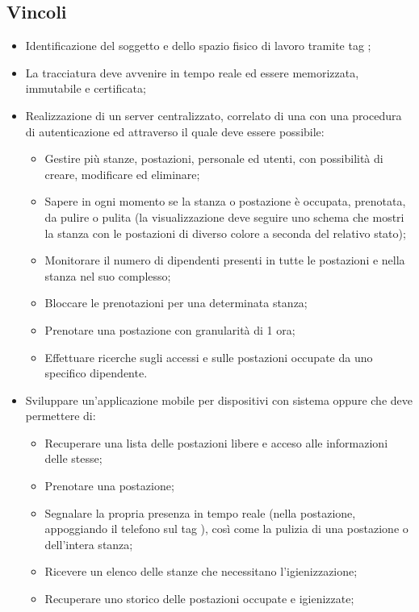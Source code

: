 \subsection{Vincoli}
\begin{itemize}
\item Identificazione del soggetto e dello spazio fisico di lavoro tramite tag ;
\item La tracciatura deve avvenire in tempo reale ed essere memorizzata, immutabile e certificata;
\item Realizzazione di un server centralizzato, correlato di una  con una procedura di autenticazione ed attraverso il quale deve essere possibile:
\begin{itemize}
\item Gestire più stanze, postazioni, personale ed utenti, con possibilità di creare, modificare ed eliminare;
\item Sapere in ogni momento se la stanza o postazione è occupata, prenotata, da pulire o pulita (la visualizzazione deve seguire uno schema che mostri la stanza con le postazioni di diverso colore a seconda del relativo stato);
\item Monitorare il numero di dipendenti presenti in tutte le postazioni e nella stanza nel suo complesso;
\item Bloccare le prenotazioni per una determinata stanza;
\item Prenotare una postazione con granularità di 1 ora;
\item Effettuare ricerche sugli accessi e sulle postazioni occupate da uno specifico dipendente.
\end{itemize}
\item Sviluppare un'applicazione mobile per dispositivi con sistema  oppure  che deve permettere di:
\begin{itemize}
\item Recuperare una lista delle postazioni libere e acceso alle informazioni delle stesse;
\item Prenotare una postazione;
\item Segnalare la propria presenza in tempo reale (nella postazione, appoggiando il telefono sul tag ), così come la pulizia di una postazione o dell'intera stanza;
\item Ricevere  un  elenco  delle  stanze  che  necessitano l’igienizzazione;
\item Recuperare uno storico delle postazioni occupate e igienizzate;
\end{itemize}

\end{itemize}
